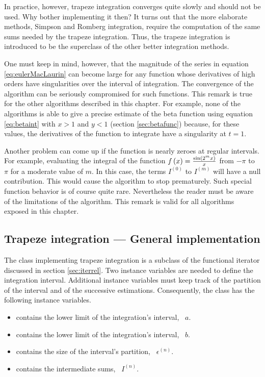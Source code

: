 In practice, however, trapeze integration converges quite slowly
and should not be used. Why bother implementing it then? It turns
out that the more elaborate methods, Simpson and Romberg
integration, require the computation of the same sums needed by
the trapeze integration. Thus, the trapeze integration is
introduced to be the superclass of the other better integration
methods.

One must keep in mind, however, that the magnitude of the series
in equation \ref{eq:eulerMacLaurin} can become large for any
function whose derivatives of high orders have singularities over
the interval of integration. The convergence of the algorithm can
be seriously compromised for such functions. This remark is true
for the other algorithms described in this chapter. For example,
none of the algorithms is able to give a precise estimate of the
beta function using equation \ref{eq:betaint} with $x>1$ and $y<1$
(\cf section \ref{sec:betafunc}) because, for these values, the
derivatives of the function to integrate have a singularity at
$t=1$.

Another problem can come up if the function is nearly zeroes at
regular intervals. For example, evaluating the integral of the
function $f\left(x\right)={\sin\left(2^mx\right)\over x}$  from
$-\pi$ to $\pi$ for a moderate value of $m$. In this case, the
terms $I^{\left(0\right)}$ to $I^{\left(m\right)}$ will have a
null contribution. This would cause the algorithm to stop
prematurely. Such special function behavior is of course quite
rare. Nevertheless the reader must be aware of the limitations of
the algorithm. This remark is valid for all algorithms exposed in
this chapter.

\subsection{Trapeze integration --- General implementation}
The class implementing trapeze integration is a subclass of the functional iterator discussed in
section \ref{sec:iterrel}. Two instance variables are needed to
define the integration interval. Additional instance variables
must keep track of the partition of the interval and of the
successive estimations. Consequently, the class has the following
instance variables.
\begin{itemize}
\item {} contains the lower limit of the integration's interval,
 \ie\ $a$.
\item {} contains the lower limit of the integration's interval,
 \ie\ $b$.
\item {} contains the size of the interval's partition,
 \ie\ $\epsilon^{\left(n\right)}$.
\item {} contains the intermediate sums, \ie\ $I^{\left(n\right)}$.
\end{itemize}

